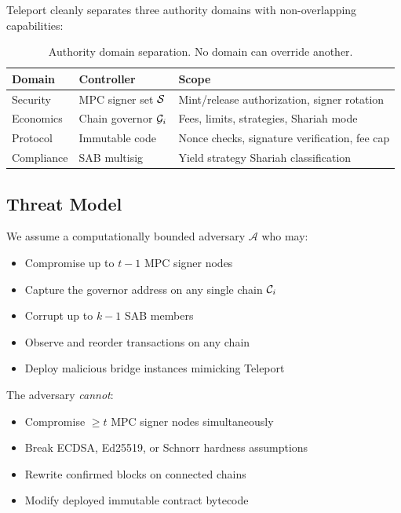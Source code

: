 Teleport cleanly separates three authority domains with non-overlapping capabilities:

\begin{table}[h]
\centering
\small
\begin{tabular}{@{}p{1.5cm}p{2.5cm}p{2.8cm}@{}}
\toprule
\textbf{Domain} & \textbf{Controller} & \textbf{Scope} \\
\midrule
Security & MPC signer set $\mathcal{S}$ & Mint/release authorization, signer rotation \\
\addlinespace
Economics & Chain governor $\mathcal{G}_i$ & Fees, limits, strategies, Shariah mode \\
\addlinespace
Protocol & Immutable code & Nonce checks, signature verification, fee cap \\
\addlinespace
Compliance & SAB multisig & Yield strategy Shariah classification \\
\bottomrule
\end{tabular}
\caption{Authority domain separation. No domain can override another.}
\label{tab:separation}
\end{table}

\subsection{Threat Model}

We assume a computationally bounded adversary $\mathcal{A}$ who may:
\begin{itemize}[nosep]
  \item Compromise up to $t - 1$ MPC signer nodes
  \item Capture the governor address on any single chain $\mathcal{C}_i$
  \item Corrupt up to $k - 1$ SAB members
  \item Observe and reorder transactions on any chain
  \item Deploy malicious bridge instances mimicking Teleport
\end{itemize}

The adversary \emph{cannot}:
\begin{itemize}[nosep]
  \item Compromise $\geq t$ MPC signer nodes simultaneously
  \item Break ECDSA, Ed25519, or Schnorr hardness assumptions
  \item Rewrite confirmed blocks on connected chains
  \item Modify deployed immutable contract bytecode
\end{itemize}


